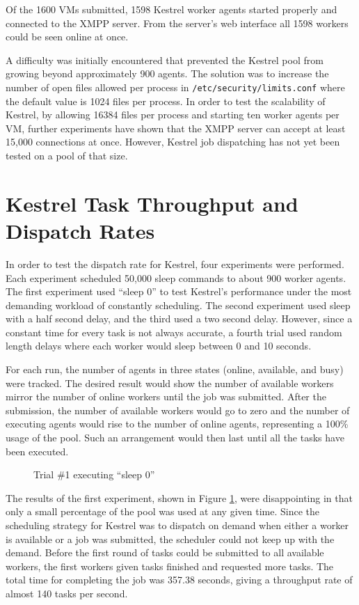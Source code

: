 Of the 1600 VMs submitted, 1598 Kestrel worker agents started properly
and connected to the XMPP server. From the server's web interface
all 1598 workers could be seen online at once. 

A difficulty was initially encountered that prevented the Kestrel
pool from growing beyond approximately 900 agents. The solution was
to increase the number of open files allowed per process in \texttt{/etc/security/limits.conf}
where the default value is 1024 files per process. In order to test
the scalability of Kestrel, by allowing 16384 files per process and
starting ten worker agents per VM, further experiments have shown
that the XMPP server can accept at least 15,000 connections at once.
However, Kestrel job dispatching has not yet been tested on a pool
of that size.

\section{Kestrel Task Throughput and Dispatch Rates}

In order to test the dispatch rate for Kestrel, four experiments were
performed. Each experiment scheduled 50,000 sleep commands to about
900 worker agents. The first experiment used ``sleep 0'' to test
Kestrel's performance under the most demanding workload of constantly
scheduling. The second experiment used sleep with a half second delay,
and the third used a two second delay. However, since a constant time
for every task is not always accurate, a fourth trial used random
length delays where each worker would sleep between 0 and 10 seconds. 

For each run, the number of agents in three states (online, available,
and busy) were tracked. The desired result would show the number of
available workers mirror the number of online workers until the job
was submitted. After the submission, the number of available workers
would go to zero and the number of executing agents would rise to
the number of online agents, representing a 100\% usage of the pool.
Such an arrangement would then last until all the tasks have been
executed. 

%
\begin{figure}
\caption{\label{fig:Trial1}Trial \#1 executing ``sleep 0''}
\end{figure}


The results of the first experiment, shown in Figure \ref{fig:Trial1},
were disappointing in that only a small percentage of the pool was
used at any given time. Since the scheduling strategy for Kestrel
was to dispatch on demand when either a worker is available or a job
was submitted, the scheduler could not keep up with the demand. Before
the first round of tasks could be submitted to all available workers,
the first workers given tasks finished and requested more tasks. The
total time for completing the job was 357.38 seconds, giving a throughput
rate of almost 140 tasks per second.

